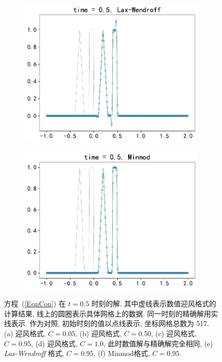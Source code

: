 \documentclass[10.5pt
]{article}
\begin{document}
\begin{figure}
\begin{subfigure}{.48\linewidth}
  \includegraphics[width=\textwidth]{figures/problem1_lax_wendroff0.95.pdf}
  \caption{}
  \label{fig:problem1-5}
\end{subfigure}
\hfill
\begin{subfigure}{.48\linewidth}
  \includegraphics[width=\textwidth]{figures/problem1_limiter0.95.pdf}
  \caption{}
  \label{fig:problem1-6}
\end{subfigure}
\caption{方程~(\ref{EqnCon}) 在 $t=0.5$ 时刻的解. 其中虚线表示数值迎风格式的计算结果, 线上的圆圈表示具体网格上的数据. 同一时刻的精确解用实线表示. 作为对照,
  初始时刻的值以点线表示, 坐标网格总数为 517. (a) 迎风格式, $C = 0.05$, (b)  迎风格式, $C = 0.50$, (c)  迎风格式, $C = 0.95$, (d) 迎风格式, $C = 1.0$,
  此时数值解与精确解完全相同, (e) \textit{Lax-Wendroff} 格式, $C=0.95$,  (f) Minmod格式, $C=0.95$.} \label{LinearW}
  \label{fig:problem1}%
\end{figure}
\end{document}
